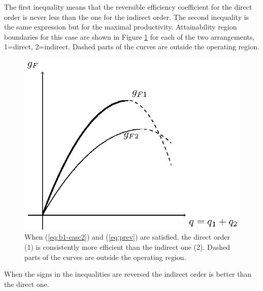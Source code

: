 \documentclass[12pt]{article}
\begin{document}
The first inequality means that the reversible efficiency coefficient for the direct order is never less than the one for the indirect order. The second inequality is the same expression but for the maximal productivity. Attainability region boundaries for this case are shown in Figure \ref{fig:pic1} for each of the two arrangements, 1=direct, 2=indirect. Dashed parts of the curves are outside the operating region.
\begin{figure}[tbh]
\centering
\includegraphics{pic1.eps}
\caption{When (\ref{eq:b1-casc2}) and (\ref{eq:prev}) are satisfied, the direct order (1) is consistently more efficient than the indirect one (2). Dashed parts of the curves are outside  the operating region.}
\label{fig:pic1}
\end{figure}
When the signs in the inequalities are reversed the indirect order is better than the direct one.
\end{document}
